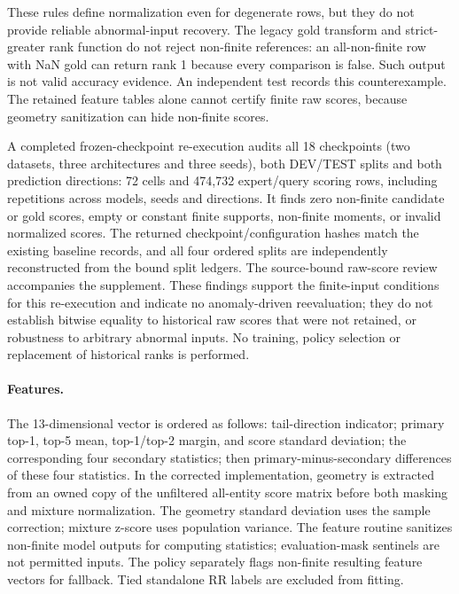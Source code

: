 \documentclass[11pt,a4paper]{article}
\begin{document}
These rules define normalization even for degenerate rows, but they do not provide reliable abnormal-input recovery. The legacy gold transform and strict-greater rank function do not reject non-finite references: an all-non-finite row with NaN gold can return rank 1 because every comparison is false. Such output is not valid accuracy evidence. An independent test records this counterexample. The retained feature tables alone cannot certify finite raw scores, because geometry sanitization can hide non-finite scores.

A completed frozen-checkpoint re-execution audits all 18 checkpoints (two datasets, three architectures and three seeds), both DEV/TEST splits and both prediction directions: 72 cells and 474,732 expert/query scoring rows, including repetitions across models, seeds and directions. It finds zero non-finite candidate or gold scores, empty or constant finite supports, non-finite moments, or invalid normalized scores. The returned checkpoint/configuration hashes match the existing baseline records, and all four ordered splits are independently reconstructed from the bound split ledgers. The source-bound raw-score review accompanies the supplement. These findings support the finite-input conditions for this re-execution and indicate no anomaly-driven reevaluation; they do not establish bitwise equality to historical raw scores that were not retained, or robustness to arbitrary abnormal inputs. No training, policy selection or replacement of historical ranks is performed.

\paragraph{Features.}
The 13-dimensional vector is ordered as follows: tail-direction indicator; primary top-1, top-5 mean, top-1/top-2 margin, and score standard deviation; the corresponding four secondary statistics; then primary-minus-secondary differences of these four statistics. In the corrected implementation, geometry is extracted from an owned copy of the unfiltered all-entity score matrix before both masking and mixture normalization. The geometry standard deviation uses the sample correction; mixture z-score uses population variance. The feature routine sanitizes non-finite model outputs for computing statistics; evaluation-mask sentinels are not permitted inputs. The policy separately flags non-finite resulting feature vectors for fallback. Tied standalone RR labels are excluded from fitting.
\end{document}
